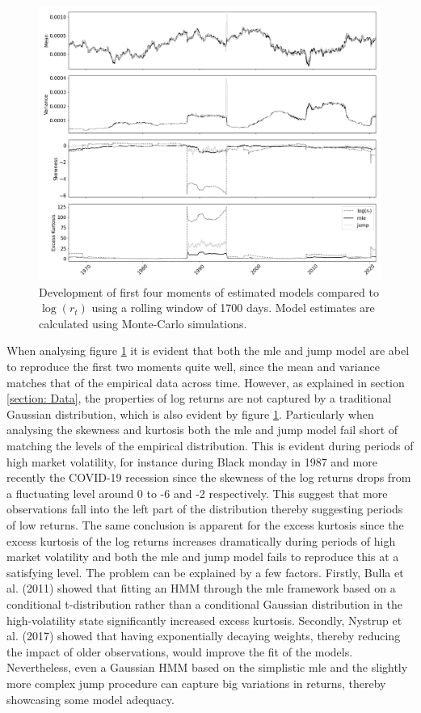 \begin{figure}[H] 
    \centering
    \includegraphics[width=1.0\textwidth]{analysis/stylized_facts/images/rolling_moments.png}
    \caption{Development of first four moments of estimated models compared to $\log(r_t)$ using a rolling window of 1700 days. Model estimates are calculated using Monte-Carlo simulations.}
    \label{fig:stylized_facts_rolling_moments} 
\end{figure}

When analysing figure \ref{fig:stylized_facts_rolling_moments} it is evident that both the mle and jump model are abel to reproduce the first two moments quite well, since the mean and variance matches that of the empirical data across time. However, as explained in section \ref{section: Data}, the properties of log returns are not captured by a traditional Gaussian distribution, which is also evident by figure \ref{fig:stylized_facts_rolling_moments}. Particularly when analysing the skewness and kurtosis both the mle and jump model fail short of matching the levels of the empirical distribution. This is evident during periods of high market volatility, for instance during Black monday in 1987 and more recently the COVID-19 recession since the skewness of the log returns drops from a fluctuating level around 0 to -6 and -2 respectively. This suggest that more observations fall into the left part of the distribution thereby suggesting periods of low returns. The same conclusion is apparent for the excess kurtosis since the excess kurtosis of the log returns increases dramatically during periods of high market volatility and both the mle and jump model fails to reproduce this at a satisfying level. The problem can be explained by a few factors. Firstly, Bulla et al. (2011) showed that fitting an HMM through the mle framework based on a conditional t-distribution rather than a conditional Gaussian distribution in the high-volatility state significantly increased excess kurtosis. Secondly, Nystrup et al. (2017) showed that having exponentially decaying weights, thereby reducing the impact of older observations, would improve the fit of the models. Nevertheless, even a Gaussian HMM based on the simplistic mle and the slightly more complex jump procedure can capture big variations in returns, thereby showcasing some model adequacy.

